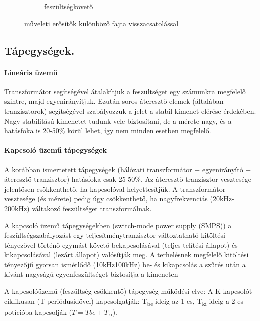 \begin{figure}[h]
\begin{subfigure}{0.33\linewidth}
		\caption{feszültségkövető}
	\end{subfigure}
	\caption{műveleti erősítők különböző fajta visszacsatolással}
	\label{fig:10-opampnegfeedbacktypes}
\end{figure}

\subsection{Tápegységek.}
\paragraph{Lineáris üzemű} Transzformátor segítségével átalakítjuk a feszültséget egy számunkra megfelelő szintre, majd egyenirányítjuk. Ezután soros áteresztő elemek (általában tranzisztorok) segítségével szabályozzuk a jelet a stabil kimenet elérése érdekében. Nagy stabilitású kimenetet tudunk vele biztosítani, de a mérete nagy, és a hatásfoka is 20-50\% körül lehet, így nem minden esetben megfelelő.
\paragraph{Kapcsoló üzemű tápegységek} A korábban ismertetett tápegységek (hálózati transzformátor + egyenirányító + áteresztő tranzisztor) hatásfoka csak 25-50\%. Az áteresztő tranzisztor vesztesége jelentősen csökkenthető, ha kapcsolóval helyettesítjük. A transzformátor vesztesége (és mérete) pedig úgy csökkenthető, ha nagyfrekvenciás (20kHz-200kHz) váltakozó feszültséget transzformálnak.

A kapcsoló üzemű tápegységekben (switch-mode power supply (SMPS)) a feszültségszabályozást egy teljesítménytranzisztor változtatható kitöltési tényezővel történő egymást követő bekapcsolásával (teljes telítési állapot) és kikapcsolásával (lezárt állapot) valósítják meg. A terhelésnek megfelelő kitöltési tényezőjű gyorsan ismétlődő (10kHz\textendash100kHz) be- és kikapcsolás a szűrés után a kívánt nagyságú egyenfeszültséget biztosítja a kimeneten

A kapcsolóüzemű (feszültség csökkentő) tápegység működési elve: A K kapcsolót ciklikusan (T periódusidővel) kapcsolgatják: T\textsubscript{be} ideig az 1-es, T\textsubscript{ki} ideig a 2-es potícióba kapcsolják ($T=T be +T_\text{ki}$).

